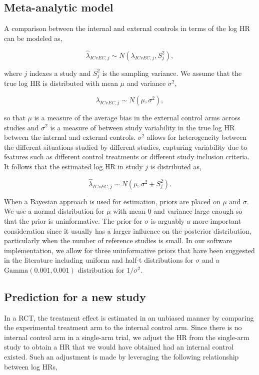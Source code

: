 \documentclass[11pt,final,fleqn]{article}\usepackage[]{graphicx}\usepackage[]{color}
\begin{document}
\subsection{Meta-analytic model} \label{subsec:meta-analytic}
A comparison between the internal and external controls in terms of the log HR can be modeled as,

\begin{equation}
\hat\lambda_{ICvEC,j} \sim N (\lambda_{ICvEC,j}, S_j^2),
\end{equation}

where $j$ indexes a study and $S_j^2$ is the sampling variance. We assume that the true log HR is distributed with mean $\mu$ and variance $\sigma^2$, 

\begin{equation}
\lambda_{ICvEC,j} \sim N ( \mu , \sigma^2),
\end{equation}

so that $\mu$ is a measure of the average bias in the external control arms across studies and $\sigma^2$ is a measure of between study variability in the true log HR between the internal and external controls. $\sigma^2$ allows for heterogeneity between the different situations studied by different studies, capturing variability due to features such as different control treatments or different study inclusion criteria. It follows that the estimated log HR in study $j$ is distributed as,

\begin{equation}
\hat\lambda_{ICvEC,j} \sim N ( \mu , \sigma^2 + S_j^2).
\end{equation}

When a Bayesian approach is used for estimation, priors are placed on $\mu$ and $\sigma$. We use a normal distribution for $\mu$ with mean $0$ and variance large enough so that the prior is uninformative. The prior for $\sigma$ is arguably a more important consideration since it usually has a larger influence on the posterior distribution, particularly when the number of reference studies is small. In our software implementation, we allow for three uninformative priors that have been suggested in the literature including uniform \cite{gelman2013bayesian} and half-t \cite{gelman2006prior, polson2012half} distributions for $\sigma$ and a $\text{Gamma}(0.001, 0.001)$ distribution \cite{spiegelhalter2004bayesian} for $1/\sigma^2$.


\subsection{Prediction for a new study} \label{subsec:prediction}
In a RCT, the treatment effect is estimated in an unbiased manner by comparing the experimental treatment arm to the internal control arm. Since there is no internal control arm in a single-arm trial, we adjust the HR from the single-arm study to obtain a HR that we would have obtained had an internal control existed. Such an adjustment is made by leveraging the following relationship between log HRs,
\end{document}
